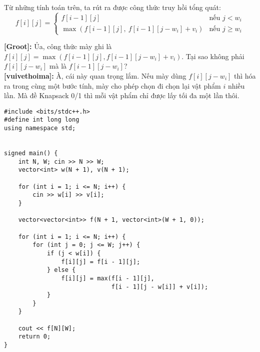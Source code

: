 Từ những tính toán trên, ta rút ra được công thức truy hồi tổng quát:
\[
f[i][j] =
\begin{cases}
    f[i - 1][j] & \text{nếu } j < w_i \\
    \max(f[i - 1][j],\ f[i - 1][j - w_i] + v_i) & \text{nếu } j \geq w_i
\end{cases}
\]



\textbf{[Groot]:} Ủa, công thức mày ghi là $f[i][j] = \max(f[i-1][j], f[i-1][j-w_i] + v_i)$. Tại sao không phải $f[i][j-w_i]$ mà là $f[i-1][j-w_i]$?\\

\textbf{[vuivethoima]:} À, cái này quan trọng lắm.  
Nếu mày dùng $f[i][j-w_i]$ thì hóa ra trong cùng một bước tính, mày cho phép chọn đi chọn lại vật phẩm $i$ nhiều lần.  
Mà đề Knapsack 0/1 thì mỗi vật phẩm chỉ được lấy tối đa một lần thôi.

\begin{lstlisting}[title=\centering \textbf{Cài đặt}]
#include <bits/stdc++.h>
#define int long long
using namespace std;


signed main() {
    int N, W; cin >> N >> W;
    vector<int> w(N + 1), v(N + 1);

    for (int i = 1; i <= N; i++) {
        cin >> w[i] >> v[i];
    }

    vector<vector<int>> f(N + 1, vector<int>(W + 1, 0));

    for (int i = 1; i <= N; i++) {
        for (int j = 0; j <= W; j++) {
            if (j < w[i]) {
                f[i][j] = f[i - 1][j];
            } else {
                f[i][j] = max(f[i - 1][j],
                              f[i - 1][j - w[i]] + v[i]);
            }
        }
    }

    cout << f[N][W];
    return 0;
}

\end{lstlisting}